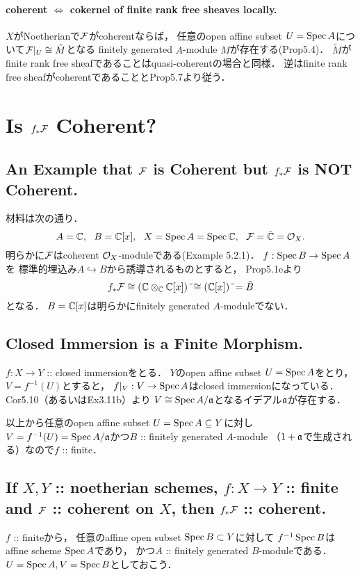 \documentclass[a4paper]{jsarticle}
\begin{document}
    \paragraph{coherent $\iff$ cokernel of finite rank free sheaves locally.}
    $X$がNoetherianで$\mathcal{F}$がcoherentならば，
    任意のopen affine subset $U=\operatorname{Spec} A$について$\mathcal{F}|_U \cong \tilde{M}$となる
    finitely generated $A$-module $M$が存在する(Prop5.4)．
    $\tilde{M}$がfinite rank free sheafであることはquasi-coherentの場合と同様．
    逆はfinite rank free sheafがcoherentであることとProp5.7より従う．

\section{Is $f_* \mathcal{F}$ Coherent?} %
    \subsection{An Example that $\mathcal{F}$ is Coherent but $f_*\mathcal{F}$ is NOT Coherent.}
    材料は次の通り．
    \[ A=\mathbb{C},~~ B=\mathbb{C}[x],~~ X=\operatorname{Spec} A=\operatorname{Spec} \mathbb{C},~~ \mathcal{F}=\tilde{\mathbb{C}}=\mathcal{O}_X. \]
    明らかに$\mathcal{F}$はcoherent $\mathcal{O}_X$-moduleである(Example 5.2.1)．
    $f: \operatorname{Spec} B \to \operatorname{Spec} A$を
    標準的埋込み$A \hookrightarrow B$から誘導されるものとすると，
    Prop5.1eより
    \[ f_* \mathcal{F} \cong (\mathbb{C} \otimes_{\mathbb{C}} \mathbb{C}[x])~\tilde{} \cong (\mathbb{C}[x])~\tilde{}=\tilde{B} \]
    となる．
    $B=\mathbb{C}[x]$は明らかにfinitely generated $A$-moduleでない．

    \subsection{Closed Immersion is a Finite Morphism.}
    $f: X \to Y$ :: closed immersionをとる．
    $Y$のopen affine subset $U=\operatorname{Spec} A$をとり，
    $V=f^{-1}(U)$とすると，
    $f|_V: V \to \operatorname{Spec} A$はclosed immersionになっている．
    Cor5.10（あるいはEx3.11b）より
    $V \cong \operatorname{Spec} A/\mathfrak{a}$となるイデアル$\mathfrak{a}$が存在する．

    以上から任意のopen affine subset $U=\operatorname{Spec} A \subseteq Y$に対し
    $V=f^{-1}(U)=\operatorname{Spec} A/\mathfrak{a}$かつ$B$ :: finitely generated $A$-module
    （$1+\mathfrak{a}$で生成される）なので$f$ :: finite．

    \subsection{If $X,Y$ :: noetherian schemes, $f: X \to Y$ :: finite and $\mathcal{F}$ :: coherent on $X$, then $f_*\mathcal{F}$ :: coherent.}
    $f$ :: finiteから，
    任意のaffine open subset $\operatorname{Spec} B \subset Y$に対して
    $f^{-1}\operatorname{Spec} B$はaffine scheme $\operatorname{Spec} A$であり，
    かつ$A$ :: finitely generated $B$-moduleである．
    $U=\operatorname{Spec} A, V=\operatorname{Spec} B$としておこう．
\end{document}
